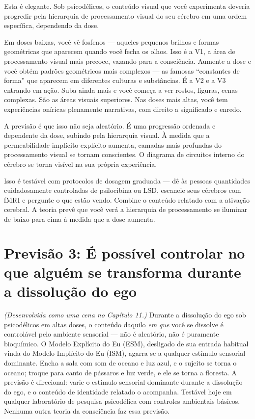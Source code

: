 \documentclass[11pt, twoside, openright]{book}
\begin{document}
Esta é elegante. Sob psicodélicos, o conteúdo visual que você experimenta deveria progredir pela hierarquia de processamento visual do seu cérebro em uma ordem específica, dependendo da dose.

Em doses baixas, você vê fosfenos --- aqueles pequenos brilhos e formas geométricas que aparecem quando você fecha os olhos. Isso é a V1, a área de processamento visual mais precoce, vazando para a consciência. Aumente a dose e você obtém padrões geométricos mais complexos --- as famosas ``constantes de forma'' que aparecem em diferentes culturas e substâncias. É a V2 e a V3 entrando em ação. Suba ainda mais e você começa a ver rostos, figuras, cenas complexas. São as áreas visuais superiores. Nas doses mais altas, você tem experiências oníricas plenamente narrativas, com direito a significado e enredo.

A previsão é que isso não seja aleatório. É uma progressão ordenada e dependente da dose, subindo pela hierarquia visual. À medida que a permeabilidade implícito-explícito aumenta, camadas mais profundas do processamento visual se tornam conscientes. O diagrama de circuitos interno do cérebro se torna visível na sua própria experiência.

Isso é testável com protocolos de dosagem graduada --- dê às pessoas quantidades cuidadosamente controladas de psilocibina ou LSD, escaneie seus cérebros com fMRI e pergunte o que estão vendo. Combine o conteúdo relatado com a ativação cerebral. A teoria prevê que você verá a hierarquia de processamento se iluminar de baixo para cima à medida que a dose aumenta.

\section*{Previsão 3: É possível controlar no que alguém se transforma durante a dissolução do ego}

\textit{(Desenvolvida como uma cena no Capítulo 11.)} Durante a dissolução do ego sob psicodélicos em altas doses, o conteúdo daquilo \textit{em que} você se dissolve é controlável pelo ambiente sensorial --- não é aleatório, não é puramente bioquímico. O Modelo Explícito do Eu (ESM), desligado de sua entrada habitual vinda do Modelo Implícito do Eu (ISM), agarra-se a qualquer estímulo sensorial dominante. Encha a sala com som de oceano e luz azul, e o sujeito se torna o oceano; troque para canto de pássaros e luz verde, e ele se torna a floresta. A previsão é direcional: varie o estímulo sensorial dominante durante a dissolução do ego, e o conteúdo de identidade relatado o acompanha. Testável hoje em qualquer laboratório de pesquisa psicodélica com controles ambientais básicos. Nenhuma outra teoria da consciência faz essa previsão.
\end{document}
